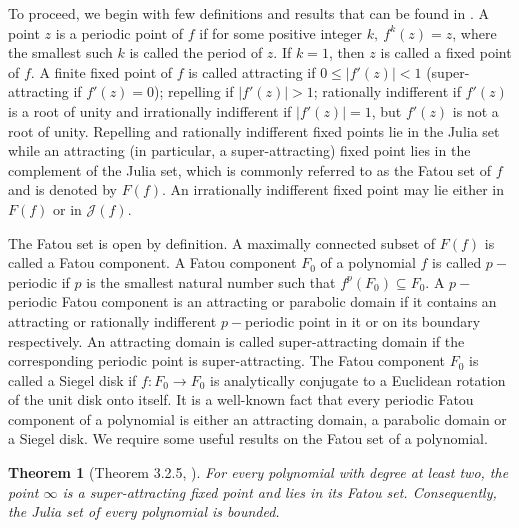 \documentclass[12pt,a4paper]{article}
\theoremstyle{plain}
\newtheorem{theorem}{Theorem}[section]
\numberwithin{equation}{section}
\begin{document}
To proceed, we begin with few definitions and results that can be found in   \cite{beardon}. A point $z$ is a periodic point of $f$ if for some positive integer $k,~ f^k(z) = z$, where the smallest such $k$ is called the period of $z$. If $k=1$, then $z$ is called a fixed point of $f$. A finite fixed point of $f$  is called attracting if $0\leq |f'(z)|<1$ (super-attracting if $f'(z)=0$); repelling if $|f'(z)|>1$; rationally indifferent if $f'(z)$ is a root of unity and irrationally indifferent if $|f'(z)|=1$, but $f'(z)$ is not a root of unity. Repelling and rationally indifferent fixed points lie in the Julia set while an attracting (in particular, a super-attracting) fixed point lies in the complement of the Julia set, which is commonly referred to as the Fatou set of $f$ and is denoted by $F(f)$. An irrationally indifferent fixed point may lie either in $F(f)$ or in $\mathcal{J}(f)$.
\par The Fatou set is open by definition. A maximally connected  subset of $F(f)$ is called a Fatou component.
A Fatou component $F_0$ of a polynomial $f$ is called $p-$periodic if $p$ is the smallest natural number such that $f^p (F_0) \subseteq F_0$. A $p-$periodic Fatou component is an attracting or parabolic domain if it contains an attracting or rationally indifferent $p-$periodic point in it or on its boundary respectively. An attracting domain is called super-attracting domain if the corresponding periodic point is super-attracting. The Fatou component $F_0$ is called  a Siegel disk if $f: F_0 \rightarrow F_0$ is analytically conjugate to a Euclidean rotation of the unit disk onto itself. It is a well-known fact that every periodic Fatou component of a polynomial is either an attracting domain, a parabolic domain or a Siegel disk.  
We require some useful results on the Fatou set of a polynomial.

\begin{theorem}[Theorem 3.2.5, \cite{beardon}]
\label{poly_map}
For every polynomial  with degree at least two, the point $\infty$ is a super-attracting fixed point and lies in its Fatou set. Consequently, the Julia set of every polynomial is bounded.
\end{theorem}
\end{document}
